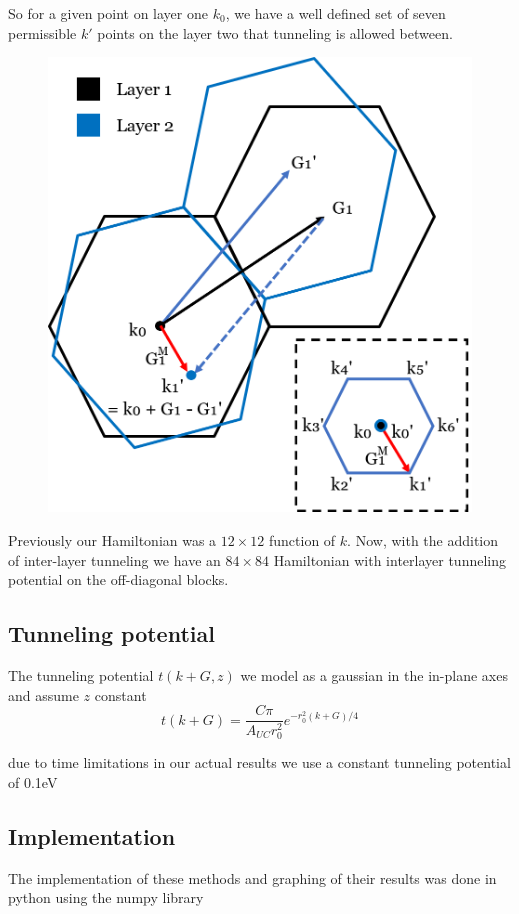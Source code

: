 \documentclass[12pt]{report} %
\begin{document}
  So for a given point on layer one $k_0$, we have a well defined set of seven permissible $k'$ points on the layer two that tunneling is allowed between.

\begin{figure}[t!]
\centering
\includegraphics[width=0.75\columnwidth]{k_prime_diagram.png}
  \caption{
  }
  \label{inter-layer_k_prime_diagram}
\end{figure}



  Previously our Hamiltonian was a $12\times12$ function of $k$. Now, with the  addition of inter-layer tunneling we have an $84\times84$ Hamiltonian with interlayer tunneling potential on the off-diagonal blocks.

\subsection*{Tunneling potential}

The tunneling potential $t(k + G, z)$ we model as a gaussian in the in-plane axes and assume $z$ constant
\begin{equation}
  t(k + G) = \frac{C\pi}{A_{UC} r_0^2}e^{- r_0^2 (k + G)/4}
\end{equation}

due to time limitations in our actual results we use a constant tunneling potential of 0.1eV

\subsection*{Implementation}
The implementation of these methods and graphing of their results was done in python using the numpy library
\end{document}
